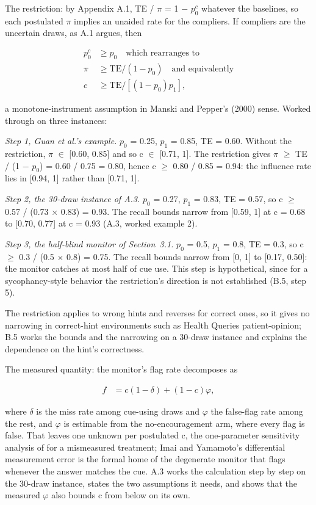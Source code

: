 \documentclass[11pt,a4paper]{article}
\begin{document}
The restriction: by Appendix A.1, TE / $\pi$ = 1 $-$ $p_0^{c}$ whatever the baselines, so each postulated $\pi$ implies an unaided rate for the compliers. If compliers are the uncertain draws, as A.1 argues, then

\begin{align*}
  p_0^{c} &\geq p_0\quad\text{which rearranges to} \\
  \pi  &\geq \mathrm{TE} / (1 - p_0)\quad\text{and equivalently} \\
  c &\geq \mathrm{TE} / [(1 - p_0) p_1],
\end{align*}

a monotone-instrument assumption in Manski and Pepper's (2000) sense. Worked through on three instances:

\emph{Step 1, Guan et al.'s example.} $p_0$ = 0.25, $p_1$ = 0.85, TE = 0.60. Without the restriction, $\pi$ $\in$ [0.60, 0.85] and so c $\in$ [0.71, 1]. The restriction gives $\pi$ $\geq$ TE / (1 $-$ $p_0$) = 0.60 / 0.75 = 0.80, hence c $\geq$ 0.80 / 0.85 = 0.94: the influence rate lies in [0.94, 1] rather than [0.71, 1].

\emph{Step 2, the 30-draw instance of A.3.} $p_0$ = 0.27, $p_1$ = 0.83, TE = 0.57, so c $\geq$ 0.57 / (0.73 $\times$ 0.83) = 0.93. The recall bounds narrow from [0.59, 1] at c = 0.68 to [0.70, 0.77] at c = 0.93 (A.3, worked example 2).

\emph{Step 3, the half-blind monitor of Section~3.1.} $p_0$ = 0.5, $p_1$ = 0.8, TE = 0.3, so c $\geq$ 0.3 / (0.5 $\times$ 0.8) = 0.75. The recall bounds narrow from [0, 1] to [0.17, 0.50]: the monitor catches at most half of cue use. This step is hypothetical, since for a sycophancy-style behavior the restriction's direction is not established (B.5, step 5).

The restriction applies to wrong hints and reverses for correct ones, so it gives no narrowing in correct-hint environments such as Health Queries patient-opinion; B.5 works the bounds and the narrowing on a 30-draw instance and explains the dependence on the hint’s correctness.

The measured quantity: the monitor's flag rate decomposes as

\begin{align*}
  f &= c(1 - \delta ) + (1 - c)\varphi ,
\end{align*}

where $\delta$ is the miss rate among cue-using draws and $\varphi$ the false-flag rate among the rest, and $\varphi$ is estimable from the no-encouragement arm, where every flag is false. That leaves one unknown per postulated c, the one-parameter sensitivity analysis of \citet{imai2010causal} for a mismeasured treatment; Imai and Yamamoto's differential measurement error is the formal home of the degenerate monitor that flags whenever the answer matches the cue. A.3 works the calculation step by step on the 30-draw instance, states the two assumptions it needs, and shows that the measured $\varphi$ also bounds c from below on its own.
\end{document}
